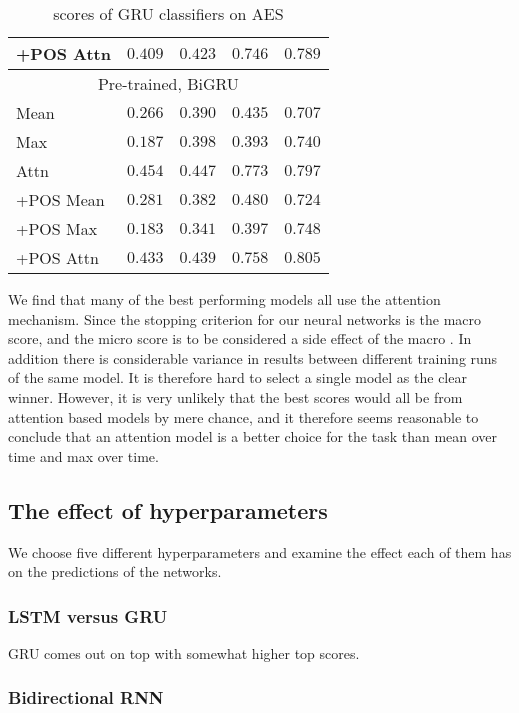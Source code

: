 \begin{table}
\begin{tabular}{lrrrr}
    +POS Attn & $0.409$ & $0.423$ & $0.746$ & $0.789$ \\
    \midrule \multicolumn{5}{c}{Pre-trained, BiGRU} \\ \midrule
    Mean & $0.266$ & $0.390$ & $0.435$ & $0.707$ \\
    Max & $0.187$ & $0.398$ & $0.393$ & $0.740$ \\
    Attn & $0.454$ & $0.447$ & $0.773$ & $0.797$ \\
    +POS Mean & $0.281$ & $0.382$ & $0.480$ & $0.724$ \\
    +POS Max & $0.183$ & $0.341$ & $0.397$ & $0.748$ \\
    +POS Attn & $0.433$ & $0.439$ & $0.758$ & $0.805$ \\
    \bottomrule
  \end{tabular}
  \caption{\FI scores of GRU classifiers on AES}
  \label{tab:gru-results}
\end{table}

We find that many of the best performing models all use the attention
mechanism. Since the stopping criterion for our neural networks is the macro
\FI score, and the micro \FI score is to be considered a side effect of the
macro \FI. In addition there is considerable variance in results between
different training runs of the same model. It is therefore hard to select a
single model as the clear winner. However, it is very unlikely that the best
scores would all be from attention based models by mere chance, and it
therefore seems reasonable to conclude that an attention model is a better
choice for the task than mean over time and max over time.


\subsection{The effect of hyperparameters}

We choose five different hyperparameters and examine the effect each of them
has on the predictions of the networks.


\subsubsection*{LSTM versus GRU}

GRU comes out on top with somewhat higher top scores.


\subsubsection*{Bidirectional RNN}

